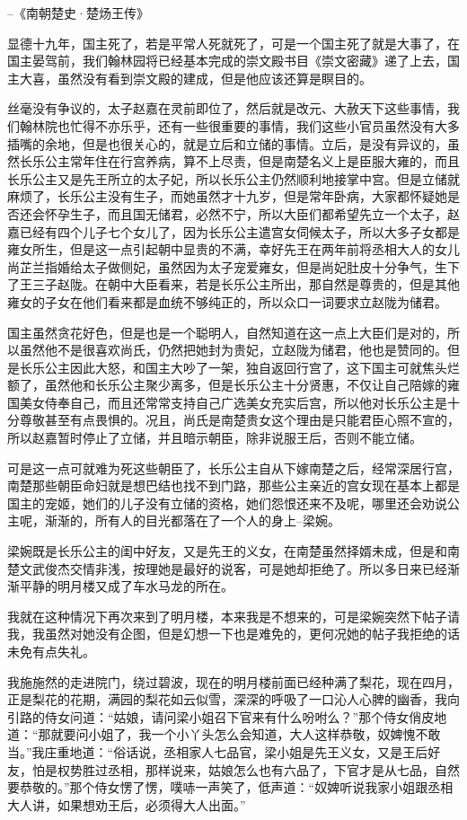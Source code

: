 --《南朝楚史·楚炀王传》

显德十九年，国主死了，若是平常人死就死了，可是一个国主死了就是大事了，在国主晏驾前，我们翰林园将已经基本完成的崇文殿书目《崇文密藏》递了上去，国主大喜，虽然没有看到崇文殿的建成，但是他应该还算是瞑目的。

丝毫没有争议的，太子赵嘉在灵前即位了，然后就是改元、大赦天下这些事情，我们翰林院也忙得不亦乐乎，还有一些很重要的事情，我们这些小官员虽然没有大多插嘴的余地，但是也很关心的，就是立后和立储的事情。立后，是没有异议的，虽然长乐公主常年住在行宫养病，算不上尽责，但是南楚名义上是臣服大雍的，而且长乐公主又是先王所立的太子妃，所以长乐公主仍然顺利地接掌中宫。但是立储就麻烦了，长乐公主没有生子，而她虽然才十九岁，但是常年卧病，大家都怀疑她是否还会怀孕生子，而且国无储君，必然不宁，所以大臣们都希望先立一个太子，赵嘉已经有四个儿子七个女儿了，因为长乐公主遣宫女伺候太子，所以大多子女都是雍女所生，但是这一点引起朝中显贵的不满，幸好先王在两年前将丞相大人的女儿尚芷兰指婚给太子做侧妃，虽然因为太子宠爱雍女，但是尚妃肚皮十分争气，生下了王三子赵陇。在朝中大臣看来，若是长乐公主所出，那自然是尊贵的，但是其他雍女的子女在他们看来都是血统不够纯正的，所以众口一词要求立赵陇为储君。

国主虽然贪花好色，但是也是一个聪明人，自然知道在这一点上大臣们是对的，所以虽然他不是很喜欢尚氏，仍然把她封为贵妃，立赵陇为储君，他也是赞同的。但是长乐公主因此大怒，和国主大吵了一架，独自返回行宫了，这下国主可就焦头烂额了，虽然他和长乐公主聚少离多，但是长乐公主十分贤惠，不仅让自己陪嫁的雍国美女侍奉自己，而且还常常支持自己广选美女充实后宫，所以他对长乐公主是十分尊敬甚至有点畏惧的。况且，尚氏是南楚贵女这个理由是只能君臣心照不宣的，所以赵嘉暂时停止了立储，并且暗示朝臣，除非说服王后，否则不能立储。

可是这一点可就难为死这些朝臣了，长乐公主自从下嫁南楚之后，经常深居行宫，南楚那些朝臣命妇就是想巴结也找不到门路，那些公主亲近的宫女现在基本上都是国主的宠姬，她们的儿子没有立储的资格，她们怨恨还来不及呢，哪里还会劝说公主呢，渐渐的，所有人的目光都落在了一个人的身上--梁婉。

梁婉既是长乐公主的闺中好友，又是先王的义女，在南楚虽然择婿未成，但是和南楚文武俊杰交情非浅，按理她是最好的说客，可是她却拒绝了。所以多日来已经渐渐平静的明月楼又成了车水马龙的所在。

我就在这种情况下再次来到了明月楼，本来我是不想来的，可是梁婉突然下帖子请我，我虽然对她没有企图，但是幻想一下也是难免的，更何况她的帖子我拒绝的话未免有点失礼。

我施施然的走进院门，绕过碧波，现在的明月楼前面已经种满了梨花，现在四月，正是梨花的花期，满园的梨花如云似雪，深深的呼吸了一口沁人心脾的幽香，我向引路的侍女问道：“姑娘，请问梁小姐召下官来有什么吩咐么？”那个侍女俏皮地道：“那就要问小姐了，我一个小丫头怎么会知道，大人这样恭敬，奴婢愧不敢当。”我庄重地道：“俗话说，丞相家人七品官，梁小姐是先王义女，又是王后好友，怕是权势胜过丞相，那样说来，姑娘怎么也有六品了，下官才是从七品，自然要恭敬的。”那个侍女愣了愣，噗哧一声笑了，低声道：“奴婢听说我家小姐跟丞相大人讲，如果想劝王后，必须得大人出面。”

